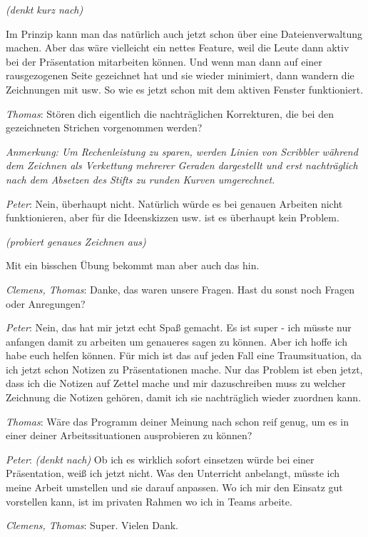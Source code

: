 \smallskip \emph{(denkt kurz nach)} 

\smallskip Im Prinzip kann man das natürlich auch jetzt schon über eine Dateienverwaltung machen. Aber das wäre vielleicht ein nettes Feature, weil die Leute dann aktiv bei der Präsentation mitarbeiten können. Und wenn man dann auf einer rausgezogenen Seite gezeichnet hat und sie wieder minimiert, dann wandern die Zeichnungen mit usw. So wie es jetzt schon mit dem aktiven Fenster funktioniert.

\medskip \emph{Thomas}: Stören dich eigentlich die nachträglichen Korrekturen, die bei den gezeichneten Strichen vorgenommen werden?

\smallskip \emph{Anmerkung: Um Rechenleistung zu sparen, werden Linien von Scribbler während dem Zeichnen als Verkettung mehrerer Geraden dargestellt und erst nachträglich nach dem Absetzen des Stifts zu runden Kurven umgerechnet.}

\medskip \emph{Peter}: Nein, überhaupt nicht. Natürlich würde es bei genauen Arbeiten nicht funktionieren, aber für die Ideenskizzen usw. ist es überhaupt kein Problem. 

\smallskip \emph{(probiert genaues Zeichnen aus)}

\smallskip Mit ein bisschen Übung bekommt man aber auch das hin.

\medskip \emph{Clemens, Thomas}: Danke, das waren unsere Fragen. Hast du sonst noch Fragen oder Anregungen?

\medskip \emph{Peter}: Nein, das hat mir jetzt echt Spaß gemacht. Es ist super - ich müsste nur anfangen damit zu arbeiten um genaueres sagen zu können. Aber ich hoffe ich habe euch helfen können. Für mich ist das auf jeden Fall eine Traumsituation, da ich jetzt schon Notizen zu Präsentationen mache. Nur das Problem ist eben jetzt, dass ich die Notizen auf Zettel mache und mir dazuschreiben muss zu welcher Zeichnung die Notizen gehören, damit ich sie nachträglich wieder zuordnen kann.

\medskip \emph{Thomas}: Wäre das Programm deiner Meinung nach schon reif genug, um es in einer deiner Arbeitssituationen ausprobieren zu können?

\medskip \emph{Peter}: \emph{(denkt nach)}
Ob ich es wirklich sofort einsetzen würde bei einer Präsentation, weiß ich jetzt nicht. Was den Unterricht anbelangt, müsste ich meine Arbeit umstellen und sie darauf anpassen. Wo ich mir den Einsatz gut vorstellen kann, ist im privaten Rahmen wo ich in Teams arbeite.

\medskip \emph{Clemens, Thomas}: Super. Vielen Dank.

